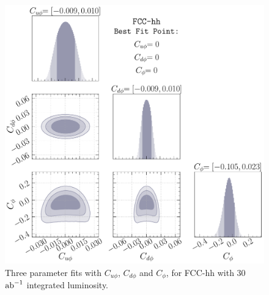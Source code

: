 \FloatBarrier
\begin{figure}[t!]
	\centering
	\includegraphics[width =0.75\linewidth]{fig/kappa_u-kappa_d-kappa_l-FCC-hh.pdf}
	\caption{ Three parameter fits with $C_{u\phi}$, $C_{d\phi}$ and $C_\phi$, for FCC-hh with 30 $\text{ab}^{-1}$ integrated luminosity.}
	\label{fig:constraint3dfcc}
\end{figure}
